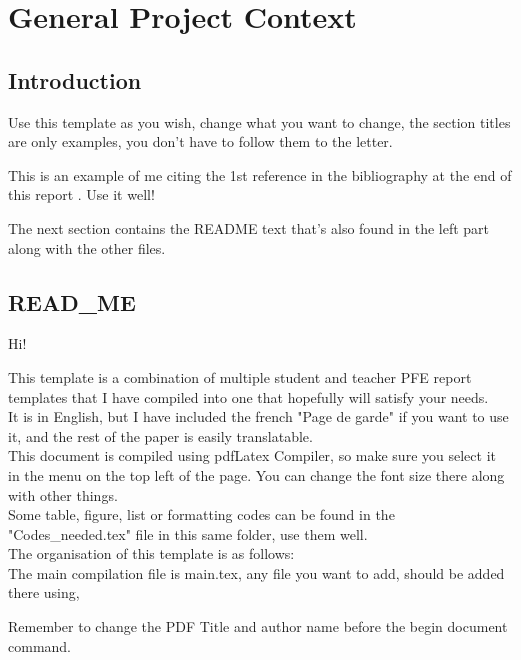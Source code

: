 \chapter{General Project Context}
\label{chap:General Project Context}


\section*{Introduction}

Use this template as you wish, change what you want to change, the section titles are only examples, you don't have to follow them to the letter.


This is an example of me citing the 1st reference in the bibliography at the end of this report \cite{ref1}. Use it well!

The next section contains the README text that's also found in the left part along with the other files.


\newpage

\section{READ\_ME}

Hi! 

This template is a combination of multiple student and teacher PFE report templates that I have compiled into one that hopefully will satisfy your needs.
\\

It is in English, but I have included the french "Page de garde" if you want to use it, and the rest of the paper is easily translatable.
\\

This document is compiled using pdfLatex Compiler, so make sure you select it in the menu on the top left of the page. You can change the font size there along with other things.
\\

Some table, figure, list or formatting codes can be found in the "Codes\_needed.tex" file in this same folder, use them well.
\\

The organisation of this template is as follows: 
\\
The main compilation file is main.tex, any file you want to add, should be added there using, %

Remember to change the PDF Title and author name before the begin document command.
\\

